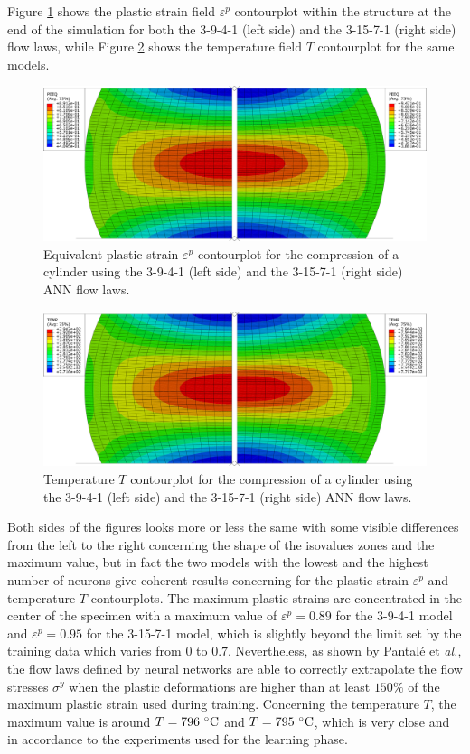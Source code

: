 \documentclass[algorithms,article,submit,pdftex,moreauthors]{Definitions/mdpi}
\makeatletter
\DeclareRobustCommand{\eal}{et \emph{al.}\@\xspace}
\makeatother
\begin{document}
Figure \ref{fig:peeqContourplot} shows the plastic strain field $\varepsilon^p$ contourplot within the structure at the end of the simulation for both the 3-9-4-1 (left side) and the 3-15-7-1 (right side) flow laws, while Figure \ref{fig:dpeeqContourplot} shows the temperature field $T$ contourplot for the same models.
\begin{figure}[!ht]
\centering
\includegraphics[width=0.90\columnwidth]{Figures/peeq}
\caption{Equivalent plastic strain $\varepsilon^p$ contourplot for the compression of a cylinder using the 3-9-4-1 (left side) and the 3-15-7-1 (right side) ANN flow laws.}
\label{fig:peeqContourplot}
\end{figure}
\begin{figure}[!ht]
\centering
\includegraphics[width=0.90\columnwidth]{Figures/temp}
\caption{Temperature $T$ contourplot for the compression of a cylinder using the 3-9-4-1 (left side) and the 3-15-7-1 (right side) ANN flow laws.}
\label{fig:dpeeqContourplot}
\end{figure}
Both sides of the figures looks more or less the same with some visible differences from the left to the right concerning the shape of the isovalues zones and the maximum value, but in fact the two models with the lowest and the highest number of neurons give coherent results concerning for the plastic strain $\varepsilon^p$ and temperature $T$ contourplots.
The maximum plastic strains are concentrated in the center of the specimen with a maximum value of $\varepsilon^p=0.89$ for the 3-9-4-1 model and $\varepsilon^p=0.95$ for the 3-15-7-1 model, which is slightly beyond the limit set by the training data which varies from $0$ to $0.7$.
Nevertheless, as shown by Pantalé \eal \cite{Pantale-2021}, the flow laws defined by neural networks are able to correctly extrapolate the flow stresses $\sigma^y$ when the plastic deformations are higher than at least $150\%$ of the maximum plastic strain used during training.
Concerning the temperature $T$, the maximum value is around $T=796~\celsius$ and $T=795~\celsius$, which is very close and in accordance to the experiments used for the learning phase.
\end{document}
